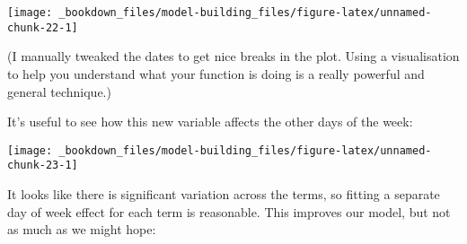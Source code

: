 \documentclass[]{book}
\newenvironment{Shaded}{\begin{snugshade}}{\end{snugshade}}
\newcommand{\KeywordTok}[1]{\textcolor[rgb]{0.13,0.29,0.53}{\textbf{{#1}}}}
\newcommand{\DataTypeTok}[1]{\textcolor[rgb]{0.13,0.29,0.53}{{#1}}}
\newcommand{\FloatTok}[1]{\textcolor[rgb]{0.00,0.00,0.81}{{#1}}}
\newcommand{\StringTok}[1]{\textcolor[rgb]{0.31,0.60,0.02}{{#1}}}
\newcommand{\NormalTok}[1]{{#1}}
\begin{document}
\begin{center}\texttt{[image: \_bookdown\_files/model-building\_files/figure-latex/unnamed-chunk-22-1]} \end{center}

(I manually tweaked the dates to get nice breaks in the plot. Using a
visualisation to help you understand what your function is doing is a
really powerful and general technique.)

It's useful to see how this new variable affects the other days of the
week:

\begin{Shaded}
\end{Shaded}

\begin{center}\texttt{[image: \_bookdown\_files/model-building\_files/figure-latex/unnamed-chunk-23-1]} \end{center}

It looks like there is significant variation across the terms, so
fitting a separate day of week effect for each term is reasonable. This
improves our model, but not as much as we might hope:

\begin{Shaded}
\end{Shaded}
\end{document}
